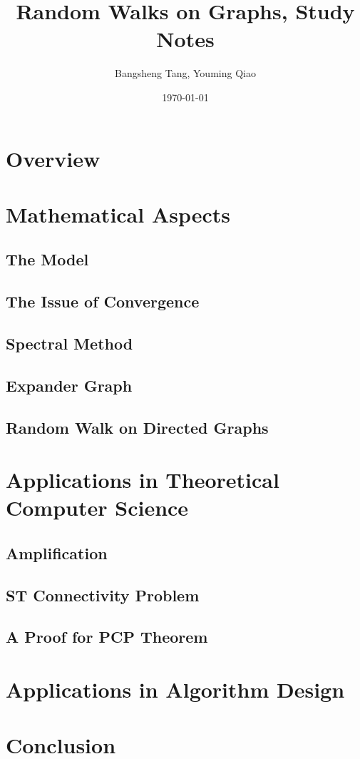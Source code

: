 \documentclass[11pt]{report}
\begin{document}
\title{Random Walks on Graphs, Study Notes}
\author{Bangsheng Tang, Youming Qiao}
\date{\today}
\maketitle \tableofcontents

\chapter{Overview}


\chapter{Mathematical Aspects}

\section{The Model}



\section{The Issue of Convergence}


\section{Spectral Method}


\section{Expander Graph}


\section{Random Walk on Directed Graphs}


\chapter{Applications in Theoretical Computer Science}

\section{Amplification}


\section{ST Connectivity Problem}


\section{A Proof for PCP Theorem}


\chapter{Applications in Algorithm Design}


\chapter{Conclusion}



\end{document}
